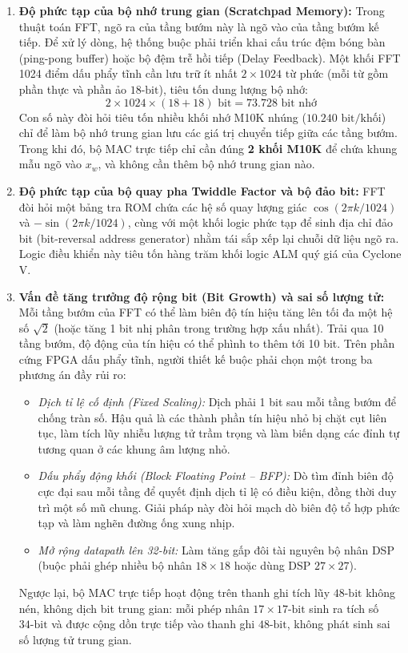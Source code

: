 \begin{enumerate}[leftmargin=1.5em, itemsep=3pt]
    \item \textbf{Độ phức tạp của bộ nhớ trung gian (Scratchpad Memory):}
    Trong thuật toán FFT, ngõ ra của tầng bướm này là ngõ vào của tầng bướm kế tiếp. Để xử lý dòng, hệ thống buộc phải triển khai cấu trúc đệm bóng bàn (ping-pong buffer) hoặc bộ đệm trễ hồi tiếp (Delay Feedback). Một khối FFT 1024 điểm dấu phẩy tĩnh cần lưu trữ ít nhất $2 \times 1024\text{ từ phức}$ (mỗi từ gồm phần thực và phần ảo $18\text{-bit}$), tiêu tốn dung lượng bộ nhớ:
    \begin{equation}
    2 \times 1024 \times (18 + 18)\text{ bit} = 73.728\text{ bit nhớ}
    \end{equation}
    Con số này đòi hỏi tiêu tốn nhiều khối nhớ M10K nhúng ($10.240\text{ bit/khối}$) chỉ để làm bộ nhớ trung gian lưu các giá trị chuyển tiếp giữa các tầng bướm. Trong khi đó, bộ MAC trực tiếp chỉ cần đúng \textbf{2 khối M10K} để chứa khung mẫu ngõ vào $x_w$, và không cần thêm bộ nhớ trung gian nào.
    \item \textbf{Độ phức tạp của bộ quay pha Twiddle Factor và bộ đảo bit:}
    FFT đòi hỏi một bảng tra ROM chứa các hệ số quay lượng giác $\cos(2\pi k / 1024)$ và $-\sin(2\pi k / 1024)$, cùng với một khối logic phức tạp để sinh địa chỉ đảo bit (bit-reversal address generator) nhằm tái sắp xếp lại chuỗi dữ liệu ngõ ra. Logic điều khiển này tiêu tốn hàng trăm khối logic ALM quý giá của Cyclone V.
    \item \textbf{Vấn đề tăng trưởng độ rộng bit (Bit Growth) và sai số lượng tử:}
    Mỗi tầng bướm của FFT có thể làm biên độ tín hiệu tăng lên tối đa một hệ số $\sqrt{2}$ (hoặc tăng 1 bit nhị phân trong trường hợp xấu nhất). Trải qua 10 tầng bướm, độ động của tín hiệu có thể phình to thêm tới 10 bit. Trên phần cứng FPGA dấu phẩy tĩnh, người thiết kế buộc phải chọn một trong ba phương án đầy rủi ro:
    \begin{itemize}[leftmargin=1.2em, itemsep=2pt]
        \item \emph{Dịch tỉ lệ cố định (Fixed Scaling):} Dịch phải 1 bit sau mỗi tầng bướm để chống tràn số. Hậu quả là các thành phần tín hiệu nhỏ bị chặt cụt liên tục, làm tích lũy nhiễu lượng tử trầm trọng và làm biến dạng các đỉnh tự tương quan ở các khung âm lượng nhỏ.
        \item \emph{Dấu phẩy động khối (Block Floating Point -- BFP):} Dò tìm đỉnh biên độ cực đại sau mỗi tầng để quyết định dịch tỉ lệ có điều kiện, đồng thời duy trì một số mũ chung. Giải pháp này đòi hỏi mạch dò biên độ tổ hợp phức tạp và làm nghẽn đường ống xung nhịp.
        \item \emph{Mở rộng datapath lên 32-bit:} Làm tăng gấp đôi tài nguyên bộ nhân DSP (buộc phải ghép nhiều bộ nhân $18 \times 18$ hoặc dùng DSP $27 \times 27$).
    \end{itemize}
    Ngược lại, bộ MAC trực tiếp hoạt động trên thanh ghi tích lũy $48\text{-bit}$ không nén, không dịch bit trung gian: mỗi phép nhân $17 \times 17\text{-bit}$ sinh ra tích số $34\text{-bit}$ và được cộng dồn trực tiếp vào thanh ghi $48\text{-bit}$, không phát sinh sai số lượng tử trung gian.
\end{enumerate}

